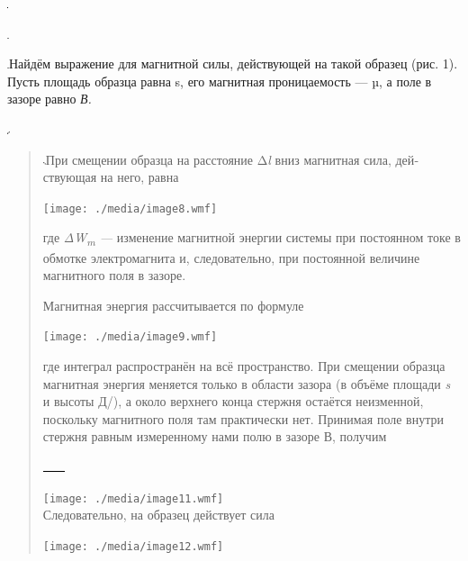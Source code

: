 \documentclass[]{article}
\begin{document}
\includegraphics{./media/image2.jpeg}

\includegraphics{./media/image4.jpeg}

\includegraphics{./media/image5.jpeg}Найдём выражение для магнитной
силы, дей­ствующей на такой образец (рис. 1). Пусть пло­щадь образца
равна s, его магнитная проницае­мость --- µ, а поле в зазоре равно
\emph{В.}

\includegraphics{./media/image6.jpeg}

\begin{quote}
\includegraphics{./media/image7.jpeg}При смещении образца на расстояние
Δ\emph{l} вниз магнитная сила, дей­ствующая на него, равна

\texttt{[image: ./media/image8.wmf]}

где \emph{ΔW\textsubscript{m} ---} изменение магнитной энергии системы
при постоянном токе в обмотке электромагнита и, следовательно, при
постоянной величине магнитного поля в зазоре.

Магнитная энергия рассчитывается по формуле

\texttt{[image: ./media/image9.wmf]}

где интеграл распространён на всё пространство. При смещении образ­ца
магнитная энергия меняется только в области зазора (в объёме пло­щади
\emph{s} и высоты Д/), а около верхнего конца стержня остаётся
неизмен­ной, поскольку магнитного поля там практически нет. Принимая
поле внутри стержня равным измеренному нами полю в зазоре В, получим

\includegraphics{./media/image10.jpeg}

\texttt{[image: ./media/image11.wmf]}\\
Следовательно, на образец действует сила

\texttt{[image: ./media/image12.wmf]}
\end{quote}
\end{document}
